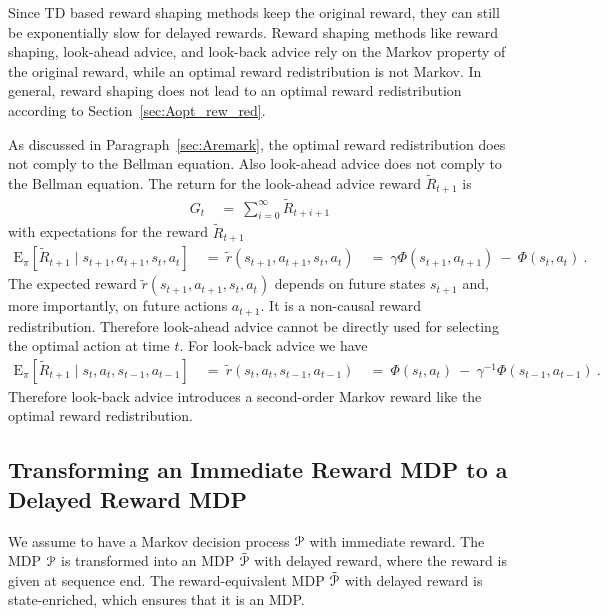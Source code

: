 \documentclass{article}
\newcommand\EXP{\mathbf{\mathrm{E}}}
\begin{document}
\begin{appendices}
Since TD based reward shaping methods keep the original reward, 
they can still be exponentially slow for delayed rewards.
Reward shaping methods like reward shaping, look-ahead advice, and
look-back advice rely on the Markov property of the original reward, 
while an optimal reward redistribution is not Markov.
In general, reward shaping does not lead to 
an optimal reward redistribution according to 
Section~\ref{sec:Aopt_rew_red}.


As discussed in Paragraph~\ref{sec:Aremark},
the optimal reward redistribution does not 
comply to the Bellman equation.
Also look-ahead advice does not comply to the 
Bellman equation.
The return for the look-ahead advice reward $\tilde{R}_{t+1}$ is
\begin{align}
  G_t \ &= \  
  \sum_{i=0}^{\infty} \tilde{R}_{t+i+1} 
\end{align}
with expectations for the reward $\tilde{R}_{t+1}$
\begin{align}
   \EXP_{\pi} \left[ \tilde{R}_{t+1} \mid  s_{t+1},a_{t+1},s_t,a_t \right]
   \ &= \ \tilde{r}(s_{t+1},a_{t+1},s_t,a_t)  \ &= \ 
  \gamma \Phi(s_{t+1},a_{t+1}) \ - \  \Phi(s_t,a_t) \ .
\end{align}
The expected reward $\tilde{r}(s_{t+1},a_{t+1},s_t,a_t)$ depends on 
future states $s_{t+1}$ and, more importantly, on future actions $a_{t+1}$.
It is a non-causal reward redistribution.
Therefore look-ahead advice cannot be directly used for selecting the 
optimal action at time $t$.
For look-back advice we have
\begin{align}
   \EXP_{\pi} \left[ \tilde{R}_{t+1} \mid  s_t,a_t,s_{t-1},a_{t-1} \right]
   \ &= \ \tilde{r}(s_t,a_t,s_{t-1},a_{t-1})  \ &= \ 
  \Phi(s_t,a_t) \ - \ \gamma^{-1}  \Phi(s_{t-1},a_{t-1}) \ .
\end{align}
Therefore look-back advice introduces a 
second-order Markov reward like the optimal reward redistribution.


\subsection{Transforming an Immediate Reward MDP to a Delayed Reward MDP}
\label{sec:Aequiv}

We assume to have a Markov decision process $\mathcal{P}$ with immediate reward. 
The MDP $\mathcal{P}$ is transformed into an MDP $\tilde{\mathcal{P}}$ with delayed
reward, where the reward is given at sequence end.
The reward-equivalent MDP $\tilde{\mathcal{P}}$ with delayed reward 
is state-enriched,
which ensures that it is an MDP. 


\end{appendices}
\end{document}
